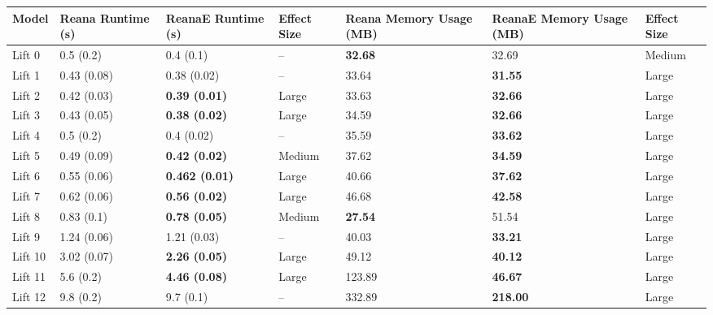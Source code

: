 \begin{tabular}{lllllll}
\toprule
   Model &     Reana Runtime (s) &     ReanaE Runtime (s) & Effect Size & Reana Memory Usage (MB) & ReanaE Memory Usage (MB) & Effect Size \\
\midrule
  Lift 0 &             0.5 (0.2) &              0.4 (0.1) &          -- &          \textbf{32.68} &                    32.69 &      Medium \\
  Lift 1 &           0.43 (0.08) &            0.38 (0.02) &          -- &                   33.64 &           \textbf{31.55} &       Large \\
  Lift 2 &           0.42 (0.03) &   \textbf{0.39 (0.01)} &       Large &                   33.63 &           \textbf{32.66} &       Large \\
  Lift 3 &           0.43 (0.05) &   \textbf{0.38 (0.02)} &       Large &                   34.59 &           \textbf{32.66} &       Large \\
  Lift 4 &             0.5 (0.2) &             0.4 (0.02) &          -- &                   35.59 &           \textbf{33.62} &       Large \\
  Lift 5 &           0.49 (0.09) &   \textbf{0.42 (0.02)} &      Medium &                   37.62 &           \textbf{34.59} &       Large \\
  Lift 6 &           0.55 (0.06) &  \textbf{0.462 (0.01)} &       Large &                   40.66 &           \textbf{37.62} &       Large \\
  Lift 7 &           0.62 (0.06) &   \textbf{0.56 (0.02)} &       Large &                   46.68 &           \textbf{42.58} &       Large \\
  Lift 8 &            0.83 (0.1) &   \textbf{0.78 (0.05)} &      Medium &          \textbf{27.54} &                    51.54 &       Large \\
  Lift 9 &           1.24 (0.06) &            1.21 (0.03) &          -- &                   40.03 &           \textbf{33.21} &       Large \\
 Lift 10 &           3.02 (0.07) &   \textbf{2.26 (0.05)} &       Large &                   49.12 &           \textbf{40.12} &       Large \\
 Lift 11 &             5.6 (0.2) &   \textbf{4.46 (0.08)} &       Large &                  123.89 &           \textbf{46.67} &       Large \\
 Lift 12 &             9.8 (0.2) &              9.7 (0.1) &          -- &                  332.89 &          \textbf{218.00} &       Large \\

\end{tabular}
